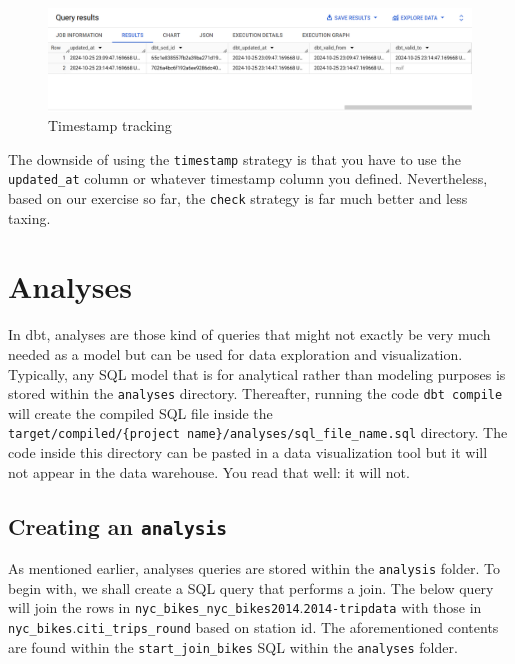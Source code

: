 \documentclass[
]{book}
\begin{document}
\begin{figure}
\centering
\includegraphics{./images/timestamp_tracking.png}
\caption{Timestamp tracking}
\end{figure}

The downside of using the \texttt{timestamp} strategy is that you have to use the \texttt{updated\_at} column or whatever timestamp column you defined. Nevertheless, based on our exercise so far, the \texttt{check} strategy is far much better and less taxing.

\hypertarget{analyses}{%
\chapter{Analyses}\label{analyses}}

In dbt, analyses are those kind of queries that might not exactly be very much needed as a model but can be used for data exploration and visualization. Typically, any SQL model that is for analytical rather than modeling purposes is stored within the \texttt{analyses} directory. Thereafter, running the code \texttt{dbt\ compile} will create the compiled SQL file inside the \texttt{target/compiled/\{project\ name\}/analyses/sql\_file\_name.sql} directory. The code inside this directory can be pasted in a data visualization tool but it will not appear in the data warehouse. You read that well: it will not.

\hypertarget{creating-an-analysis}{%
\section{\texorpdfstring{Creating an \texttt{analysis}}{Creating an analysis}}\label{creating-an-analysis}}

As mentioned earlier, analyses queries are stored within the \texttt{analysis} folder. To begin with, we shall create a SQL query that performs a join. The below query will join the rows in \texttt{nyc\_bikes\_nyc\_bikes2014}.\texttt{2014-tripdata} with those in \texttt{nyc\_bikes}.\texttt{citi\_trips\_round} based on station id. The aforementioned contents are found within the \texttt{start\_join\_bikes} SQL within the \texttt{analyses} folder.
\end{document}
